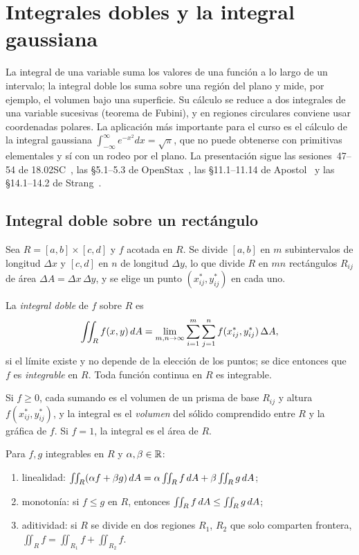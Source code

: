 \chapter{Integrales dobles y la integral gaussiana}
\label{tema:6}

La integral de una variable suma los valores de una función a lo largo de un intervalo; la integral doble los suma sobre una región del plano y mide, por ejemplo, el volumen bajo una superficie. Su cálculo se reduce a dos integrales de una variable sucesivas (teorema de Fubini), y en regiones circulares conviene usar coordenadas polares. La aplicación más importante para el curso es el cálculo de la integral gaussiana $\int_{-\infty}^{\infty}e^{-x^2}dx=\sqrt\pi$, que no puede obtenerse con primitivas elementales y sí con un rodeo por el plano. La presentación sigue las sesiones~47--54 de 18.02SC~\cite{mit1802}, las §5.1--5.3 de OpenStax~\cite{openstax3}, las §11.1--11.14 de Apostol~\cite{apostol2} y las §14.1--14.2 de Strang~\cite{strangcalc}.

\section{Integral doble sobre un rectángulo}

Sea $R=[a,b]\times[c,d]$ y $f$ acotada en $R$. Se divide $[a,b]$ en $m$ subintervalos de longitud $\Delta x$ y $[c,d]$ en $n$ de longitud $\Delta y$, lo que divide $R$ en $mn$ rectángulos $R_{ij}$ de área $\Delta A=\Delta x\,\Delta y$, y se elige un punto $(x_{ij}^*,y_{ij}^*)$ en cada uno.

\begin{definicion}\label{def:integral-doble}
La \emph{integral doble} de $f$ sobre $R$ es
\[
\iint_R f(x,y)\,dA=\lim_{m,n\to\infty}\sum_{i=1}^{m}\sum_{j=1}^{n}f(x_{ij}^*,y_{ij}^*)\,\Delta A ,
\]
si el límite existe y no depende de la elección de los puntos; se dice entonces que $f$ es \emph{integrable} en $R$. Toda función continua en $R$ es integrable.
\end{definicion}

Si $f\ge0$, cada sumando es el volumen de un prisma de base $R_{ij}$ y altura $f(x_{ij}^*,y_{ij}^*)$, y la integral es el \emph{volumen} del sólido comprendido entre $R$ y la gráfica de $f$. Si $f=1$, la integral es el área de $R$.

\begin{proposicion}[Propiedades]\label{prop:propiedades-integral}
Para $f,g$ integrables en $R$ y $\alpha,\beta\in\mathbb{R}$:
\begin{enumerate}
  \item linealidad: $\iint_R(\alpha f+\beta g)\,dA=\alpha\iint_Rf\,dA+\beta\iint_Rg\,dA$;
  \item monotonía: si $f\le g$ en $R$, entonces $\iint_Rf\,dA\le\iint_Rg\,dA$;
  \item aditividad: si $R$ se divide en dos regiones $R_1$, $R_2$ que solo comparten frontera, $\iint_R f=\iint_{R_1}f+\iint_{R_2}f$.
\end{enumerate}
\end{proposicion}

